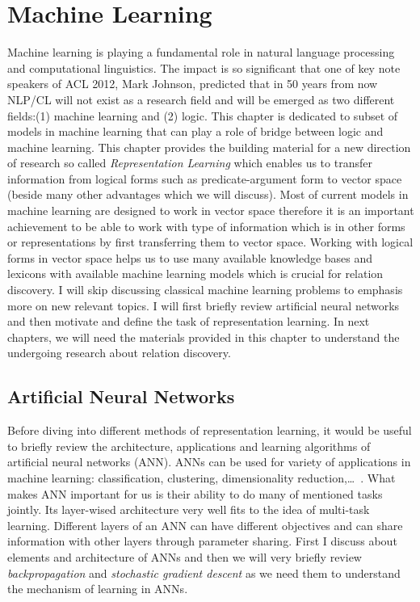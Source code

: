 \chapter{Machine Learning}
Machine learning is playing a fundamental role in natural language processing
and computational linguistics. The impact is so significant that one of key note
speakers of ACL 2012, Mark Johnson, predicted that in 50 years from now NLP/CL
will not exist as a research field and will be emerged as two different
fields:(1) machine learning and (2) logic. This chapter is dedicated  to subset
of models in machine learning that can play a role of bridge between logic and
machine learning. This chapter provides the building material for a new
direction of research so called \textit{Representation Learning} which enables
us to transfer information from logical forms such as predicate-argument form to
vector space (beside many other advantages which we will discuss).
Most of current models in machine learning are designed to work in vector space
therefore it is an important achievement to be able to work with type of
information which is in other forms or representations by first transferring
them to vector space. Working with logical forms in vector space helps us to use
many available knowledge bases and lexicons with available machine learning
models which is crucial for relation discovery. I will skip discussing classical
machine learning problems to emphasis more on new relevant topics. 
I will first briefly review artificial neural networks and then motivate and
define the task of representation learning. In next chapters, we will
need the materials provided in this chapter to understand the undergoing
research about relation discovery.
\section{Artificial Neural Networks}
\label{sec:ml-ann}
Before diving into different methods of representation learning, it would be
useful to briefly review the architecture, applications and learning algorithms
of artificial neural networks (ANN). ANNs can be used for variety of
applications in machine learning: classification, clustering, dimensionality
reduction,\ldots ~. What makes ANN important for us is their ability to do many
of mentioned tasks jointly. Its layer-wised architecture very well fits to the
idea of multi-task learning. Different layers of an ANN can have different
objectives and can share information with other layers through parameter
sharing. First I discuss about elements and architecture of ANNs and then we
will very briefly review \textit{backpropagation} and \textit{stochastic
gradient descent} as we need them to understand the mechanism of learning in
ANNs.

